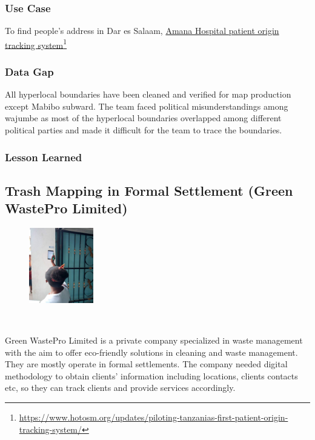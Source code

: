 \documentclass[a4paper,12pt,twoside]{article}
\begin{document}
\subsubsection{Use Case}
To find people’s address in Dar es Salaam, \href{https://www.hotosm.org/updates/piloting-tanzanias-first-patient-origin-tracking-system/}{Amana Hospital patient origin tracking system}\footnote{\url{https://www.hotosm.org/updates/piloting-tanzanias-first-patient-origin-tracking-system/}}

\subsubsection{Data Gap}
All hyperlocal boundaries have been cleaned and verified for map production except Mabibo subward. The team faced political misunderstandings among wajumbe as most of the hyperlocal boundaries overlapped among different political parties and made it difficult for the team to trace the boundaries.

\subsubsection{Lesson Learned}

\newpage
\subsection{Trash Mapping in Formal Settlement (Green WastePro Limited)}

\begin{figure} %
    \centering
    
    \includegraphics[width=0.25\textwidth]{images/Scanning_barcodes.png}
\end{figure}


\

Green WastePro Limited is a private company specialized in waste management with the aim to offer eco-friendly solutions in cleaning and waste management. They are mostly operate in formal settlements. The company needed digital methodology to obtain clients’ information including locations, clients contacts etc, so they can track clients and provide services accordingly.
\end{document}
